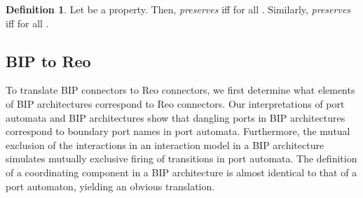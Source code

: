 \documentclass[submission,copyright,creativecommons,hidelinks]{eptcs}
\theoremstyle{plain} \newtheorem{theorem}{Theorem}
\theoremstyle{definition}
\newtheorem{definition}{Definition}
\theoremstyle{remark}
\begin{document}
\begin{definition}
\label{defn:prop-data-agnostic}
Let  be a property. Then, \emph{ preserves } iff  for all . Similarly, \emph{ preserves } iff  for all .
\end{definition}



\subsection{BIP to Reo}
\label{sec:bip2reo_a}
To translate BIP connectors to Reo connectors, we first determine what elements of BIP architectures correspond to Reo connectors. Our interpretations of port automata and BIP architectures show that dangling ports in BIP architectures correspond to boundary port names in port automata. Furthermore, the mutual exclusion of the interactions in an interaction model in a BIP architecture simulates mutually exclusive firing of transitions in port automata. The definition of a coordinating component in a BIP architecture is almost identical to that of a port automaton, yielding an obvious translation.
\end{document}
